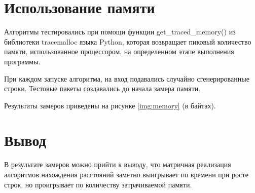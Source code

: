  
\section{Использование памяти}

Алгоритмы тестировались при помощи функции get\_traced\_memory() из библиотеки tracemalloc языка Python, которая возвращает пиковый количество памяти, использованное процессором, на определенном этапе выполнения программы.

При каждом запуске алгоритма, на вход подавались случайно сгенерированные строки. Тестовые пакеты создавались до начала замера памяти.

Результаты замеров приведены на рисунке \ref{img:memory} (в байтах).


\section*{Вывод}

В результате замеров можно прийти к выводу, что матричная реализация алгоритмов нахождения расстояний заметно выигрывает по времени при росте строк, но проигрывает по количеству затрачиваемой памяти.
